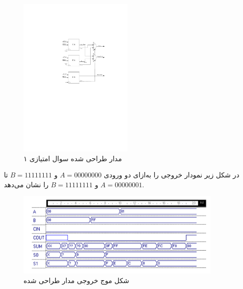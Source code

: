 

\begin{figure}[h]
	\centering
	\includegraphics[width=0.5\textwidth]{fig/Q8.pdf}
	\caption{مدار طراحی شده سوال امتیازی ۱}
	\label{Qb1_Design}
\end{figure}

در شکل زیر نمودار خروجی را به‌ازای دو ورودی $A=00000000 $ و $B=11111111 $ تا $ A=00000001 $ و $B=11111111 $ را نشان می‌دهد.

\begin{figure}[h]
	\centering
	\includegraphics[width=0.9\textwidth]{fig/QB1_2.png}
	\caption{شکل موج خروجی مدار طراحی شده}
	\label{Qb1_2_Design}
\end{figure}